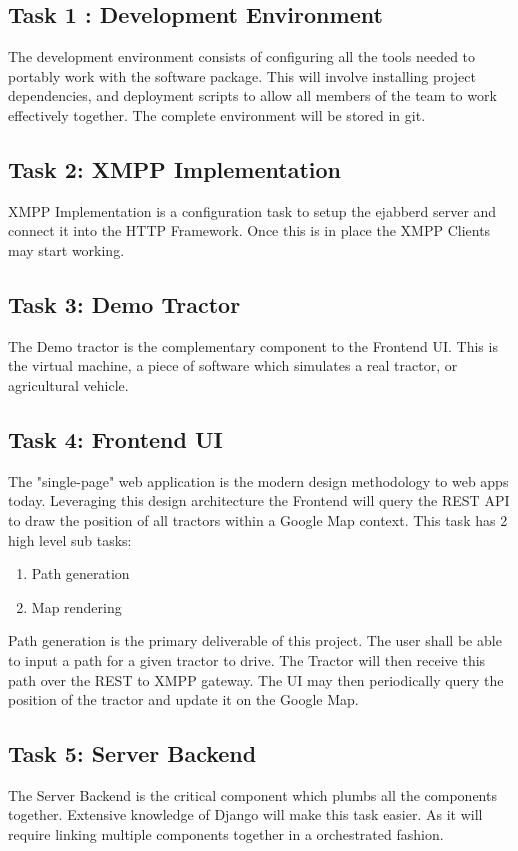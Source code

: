 \documentclass[conference,12pt]{IEEEtran}
\begin{document}
\subsection{Task 1 : Development Environment}
The development environment consists of configuring all the tools needed to
portably work with the software package. This will involve installing project
dependencies, and deployment scripts to allow all members of the team to work
effectively together. The complete environment will be stored in git.
\subsection{Task 2: XMPP Implementation}
XMPP Implementation is a configuration task to setup the ejabberd
server and connect it into the HTTP Framework. Once this is in place the XMPP
Clients may start working.
\subsection{Task 3: Demo Tractor}
The Demo tractor is the complementary component to the Frontend UI. This is the
virtual machine, a piece of software which simulates a real tractor, or
agricultural vehicle. 
\subsection{Task 4: Frontend UI}
The "single-page" web application is the modern design methodology to web apps
today. Leveraging this design architecture the Frontend will query the REST API
to draw the position of all tractors within a Google Map context. This task has
2 high level sub tasks:
\begin{enumerate}
\item Path generation
\item Map rendering
\end{enumerate}
Path generation is the primary deliverable of this project. The user shall be
able to input a path for a given tractor to drive. The Tractor will then receive
this path over the REST to XMPP gateway.  The UI may then periodically query the
position of the tractor and update it on the Google Map.
\subsection{Task 5: Server Backend}
The Server Backend is the critical component which plumbs all the components
together. Extensive knowledge of Django will make this task easier. As it will
require linking multiple components together in a orchestrated fashion.
\end{document}
